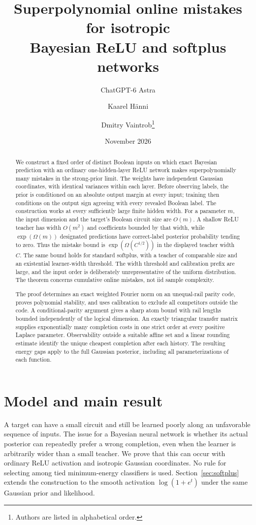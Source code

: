 \documentclass[11pt]{article}
\title{Superpolynomial online mistakes for isotropic\protect\\ Bayesian ReLU and softplus networks}
\author{ChatGPT-6 Astra \and Kaarel H\"anni \and Dmitry Vaintrob\thanks{Authors are listed in alphabetical order.}}
\date{November 2026}
\theoremstyle{remark}\newtheorem{remark}[theorem]{Remark}
\begin{document}
\maketitle
\begin{abstract}
We construct a fixed order of distinct Boolean inputs on which exact
Bayesian prediction with an ordinary one-hidden-layer ReLU network makes
superpolynomially many mistakes in the strong-prior limit. The weights
have independent Gaussian coordinates, with identical variances within
each layer. Before observing labels, the prior is conditioned on an
absolute output margin at every input; training then conditions on the
output sign agreeing with every revealed Boolean label.
The construction works at every sufficiently large finite hidden width.
For a parameter $m$, the input dimension and the target's Boolean circuit
size are $O(m)$. A shallow ReLU teacher has width $O(m^2)$ and
coefficients bounded by that width, while $\exp(\Omega(m))$ designated
predictions have correct-label posterior probability tending to zero.
Thus the mistake bound is $\exp(\Omega(C^{1/2}))$ in the displayed
teacher width $C$. The same bound holds for standard softplus, with a
teacher of comparable size and an existential learner-width threshold.
The width threshold and calibration prefix are large, and the input
order is deliberately unrepresentative of the uniform distribution.
The theorem concerns cumulative online mistakes, not iid sample complexity.

The proof determines an exact weighted Fourier norm on an unequal-rail
parity code, proves polynomial stability, and uses calibration to exclude
all competitors outside the code. A conditional-parity argument gives a sharp atom bound with
rail lengths bounded independently of the logical dimension. An exactly triangular transfer matrix supplies exponentially many
completion costs in one strict order at every positive Laplace parameter. Observability outside a suitable affine set and a
linear rounding estimate identify the unique cheapest completion after
each history. The resulting energy gaps apply to the full Gaussian
posterior, including all parameterizations of each function.
\end{abstract}

\section{Model and main result}

A target can have a small circuit and still be learned poorly along an
unfavorable sequence of inputs. The issue for a Bayesian neural network
is whether its actual posterior can repeatedly prefer a wrong completion,
even when the learner is arbitrarily wider than a small teacher. We prove
that this can occur with ordinary ReLU activation and isotropic Gaussian
coordinates. No rule for selecting among tied minimum-energy classifiers
is used.
Section~\ref{sec:softplus} extends the construction to the smooth
activation $\log(1+e^t)$ under the same Gaussian prior and likelihood.
\end{document}

